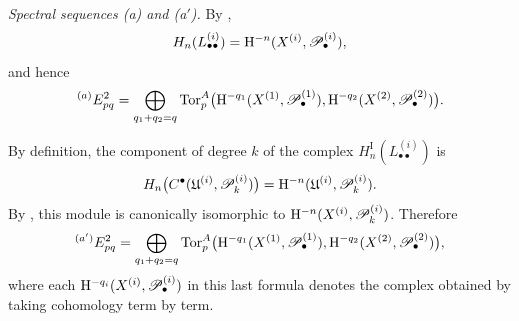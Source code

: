 \begin{env}[6.6.3]
\label{III.6.6.3}
\emph{Spectral sequences \textnormal{(a)} and
\textnormal{(a$'$)}.}
By ,
\[
  H_n(L_{\bullet\bullet}^{(i)})
  =
  \mathrm H^{-n}(X^{(i)},\mathscr{P}_\bullet^{(i)}),
\]
and hence
\[
  {}^{(a)}E_{pq}^2
  =
  \bigoplus_{q_1+q_2=q}
  \operatorname{Tor}_p^A
  \bigl(
    \mathrm H^{-q_1}(X^{(1)},\mathscr{P}_\bullet^{(1)}),
    \mathrm H^{-q_2}(X^{(2)},\mathscr{P}_\bullet^{(2)})
  \bigr).
\]

By definition, the component of degree $k$ of the complex
$H_n^{\mathrm I}(L_{\bullet\bullet}^{(i)})$ is
\[
  H_n\bigl(
    C^\bullet(\mathfrak U^{(i)},\mathscr{P}_k^{(i)})
  \bigr)
  =
  \mathrm H^{-n}(\mathfrak U^{(i)},\mathscr{P}_k^{(i)}).
\]
By , this module is canonically isomorphic to
$\mathrm H^{-n}(X^{(i)},\mathscr{P}_k^{(i)})$.  Therefore
\[
  {}^{(a')}E_{pq}^2
  =
  \bigoplus_{q_1+q_2=q}
  \operatorname{Tor}_p^A
  \bigl(
    \mathrm H^{-q_1}(X^{(1)},\mathscr{P}_\bullet^{(1)}),
    \mathrm H^{-q_2}(X^{(2)},\mathscr{P}_\bullet^{(2)})
  \bigr),
\]
where each $\mathrm H^{-q_i}(X^{(i)},\mathscr{P}_\bullet^{(i)})$ in this
last formula denotes the complex obtained by taking cohomology
term by term.
\end{env}

